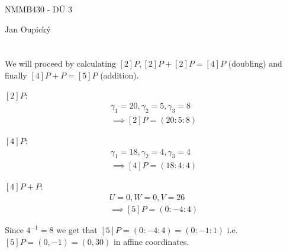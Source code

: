 \documentclass[12pt, a4paper]{article}
\begin{document}
\begin{center}
\large NMMB430 - DÚ 3

\normalsize Jan Oupický
\end{center}
\vspace{1\baselineskip}

\section{}
We will proceed by calculating $[2]P, [2]P+[2]P = [4]P$ (doubling) and finally $[4]P+P=[5]P$ (addition).

$[2]P$:
\begin{gather*}
\gamma_1 = 20, \gamma_2 = 5, \gamma_3 = 8\\
\implies
[2]P = (20:5:8)
\end{gather*}

$[4]P$:
\begin{gather*}
\gamma_1 = 18, \gamma_2 = 4, \gamma_3 = 4\\
\implies
[4]P = (18:4:4)
\end{gather*}

$[4]P+P$:
\begin{gather*}
U = 0, W = 0, V = 26\\
\implies
[5]P = (0:-4:4)
\end{gather*}

Since $4^{-1} = 8$ we get that $[5]P = (0:-4:4) = (0:-1:1)$ i.e. $[5]P = (0,-1) = (0,30)$ in affine coordinates.
\end{document}
